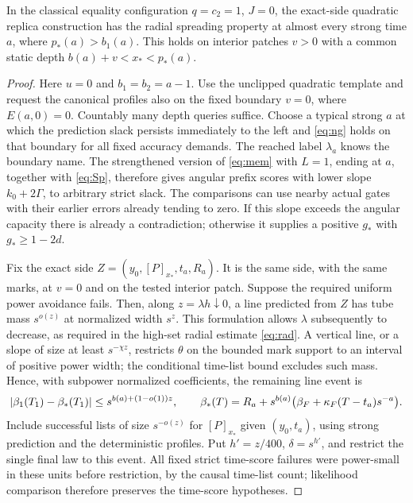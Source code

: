 \begin{lemma}\label{act:stationary-boundary}
In the classical equality configuration $q=c_2=1$, $J=0$, the
exact-side quadratic replica construction has the radial spreading
property at almost every strong time $a$, where $p_*(a)>b_1(a)$.
This holds on interior patches $v>0$ with a common static depth
$b(a)+v<x_*<p_*(a)$.
\end{lemma}

\begin{proof}
Here $u=0$ and $b_1=b_2=a-1$.  Use the unclipped quadratic template
and request the canonical profiles also on the fixed boundary $v=0$,
where $E(a,0)=0$.  Countably many depth queries suffice.  Choose a
typical strong $a$ at which the prediction slack persists immediately
to the left and \eqref{eq:ng} holds on that boundary for all fixed
accuracy demands.  The reached label $\lambda_a$ knows the boundary
name.  The strengthened version of \eqref{eq:mem} with $L=1$, ending
at $a$, together with \eqref{eq:Sp}, therefore gives angular prefix
scores with lower slope $k_0+2\Gamma$, to arbitrary strict slack.
The comparisons can use nearby actual gates with their earlier
errors already tending to zero.  If this slope exceeds the angular
capacity there is already a contradiction; otherwise it supplies a
positive $g_*$ with $g_*\ge1-2d$.

Fix the exact side $Z=(y_0,[P]_{x_*},t_a,R_a)$.  It is the same
side, with the same marks, at $v=0$ and on the tested interior
patch.  Suppose the required uniform power avoidance fails.
Then, along $z=\lambda h\downarrow0$, a line predicted from $Z$
has tube mass $s^{o(z)}$ at normalized width $s^z$.  This formulation
allows $\lambda$ subsequently to decrease, as required in the
high-set radial estimate \eqref{eq:rad}.  A vertical line, or a
slope of size at least $s^{-\chi z}$, restricts $\theta$ on the
bounded mark support to an interval of positive power width; the
conditional time-list bound excludes such mass.  Hence, with
subpower normalized coefficients, the remaining line event is
\[
 \lvert \beta_1(T_1)-\beta_*(T_1)\rvert
   \le s^{b(a)+(1-o(1))z},\qquad
 \beta_*(T)=R_a+s^{b(a)}
       \bigl(\beta_F+\kappa_F(T-t_a)s^{-a}\bigr).
\]
Include successful lists of size $s^{-o(z)}$ for $[P]_{x_*}$ given
$(y_0,t_a)$, using strong prediction and the deterministic profiles.
Put $h'=z/400$, $\delta=s^{h'}$, and restrict the single final law
to this event.  All fixed strict time-score failures were power-small
in these units before restriction, by the causal time-list count;
likelihood comparison therefore preserves the time-score hypotheses.


\end{proof}
